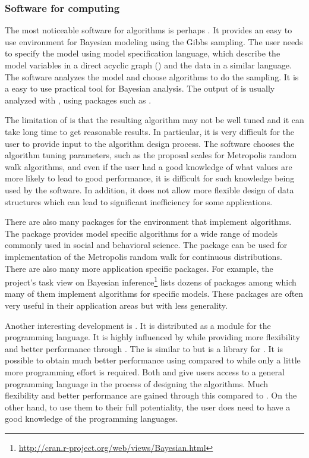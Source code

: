 \subsubsection{Software for \protect\mcmc computing}
\label{ssub:Softwares for mcmc computing}

The most noticeable software for \mcmc algorithms is perhaps \bugs \cite{bugs, bugsbook}. It provides an easy to use environment for Bayesian modeling using the Gibbs sampling. The user needs to specify the model using \bugs model specification language, which describe the model variables in a direct acyclic graph (\dag) and the data in a similar language. The software analyzes the model and choose \mcmc algorithms to do the sampling. It is a easy to use practical tool for Bayesian analysis. The output of \bugs is usually analyzed with \rlang, using packages such as \rcoda \cite{rcoda}.

The limitation of \bugs is that the resulting algorithm may not be well tuned and it can take long time to get reasonable results. In particular, it is very difficult for the user to provide input to the algorithm design process. The software chooses the algorithm tuning parameters, such as the proposal scales for Metropolis random walk algorithms, and even if the user had a good knowledge of what values are more likely to lead to good performance, it is difficult for such knowledge being used by the software. In addition, it does not allow more flexible design of data structures which can lead to significant inefficiency for some applications.

There are also many packages for the \rlang environment that implement \mcmc algorithms. The \rmcmcpack \cite{rmcmcpack} package provides model specific \mcmc algorithms for a wide range of models commonly used in social and behavioral science. The \rmcmc \cite{rmcmc} package can be used for implementation of the Metropolis random walk for continuous distributions. There are also many more application specific packages. For example, the \rlang project's task view on Bayesian inference\footnote{\url{http://cran.r-project.org/web/views/Bayesian.html}} lists dozens of packages among which many of them implement \mcmc algorithms for specific models. These packages are often very useful in their application areas but with less generality.

Another interesting development is \pymc \cite{pymc}. It is distributed as a module for the \python programming language. It is highly influenced by \bugs while providing more flexibility and better performance through \python. The \cppbugs \cite{cppbugs} is similar to \pymc but is a library for \cpp. It is possible to obtain much better performance using \cppbugs compared to \bugs while only a little more programming effort is required. Both \pymc and \cppbugs give users access to a general programming language in the process of designing the algorithms. Much flexibility and better performance are gained through this compared to \bugs. On the other hand, to use them to their full potentiality, the user does need to have a good knowledge of the programming languages.

